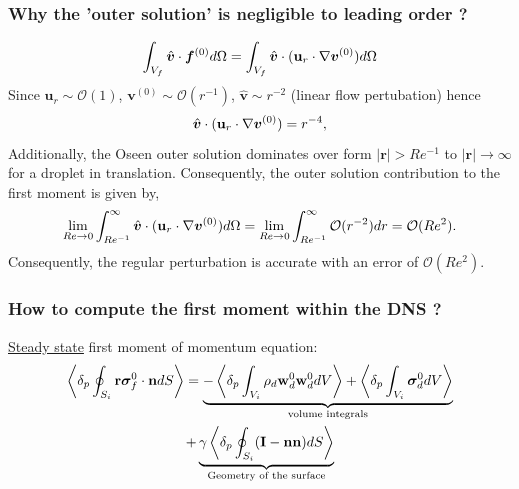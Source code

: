 \documentclass{sintefbeamer}
\begin{document}
\begin{frame}
  \frametitle{Why the 'outer solution' is negligible to leading order ?}
  \begin{equation}
    \int _{V_f}\hat{\bm v} \cdot \bm f^{(0)} d\Omega= \int _{V_f}\hat{\bm v}\cdot(\textbf{u}_r\cdot\grad \bm v^{(0)}) d\Omega
  \end{equation}
  Since $\textbf{u}_r\sim \mathcal{O}(1)$, $\bm v^{(0)}\sim \mathcal{O}(r^{-1})$, $\hat{\bm v} \sim r^{-2}$ (linear flow pertubation) hence 
  \begin{equation}
    \hat{\bm v}\cdot(\textbf{u}_r\cdot\grad \bm v^{(0)}) = r^{-4},
  \end{equation}
  Additionally, the Oseen outer solution dominates over form $|\textbf{r}| > Re^{-1}$ to $|\textbf{r}|\to \infty$ for a droplet in translation.
  Consequently, the outer solution contribution to the first moment is given by, 
  \begin{equation}
      \lim_{Re \to 0 }
      \int_{Re^{-1}}^\infty
      \hat{\bm v}\cdot(\textbf{u}_r\cdot\grad \bm v^{(0)})
      d\Omega
      =
      \lim_{Re \to 0 }
      \int_{Re^{-1}}^\infty
      \mathcal{O}(r^{-2})
      dr
      = \mathcal{O}(Re^2). 
  \end{equation}
  Consequently, the regular perturbation is accurate with an error of $\mathcal{O}(Re^2)$. 
\end{frame}

\begin{frame}
  \frametitle{How to compute the first moment within the DNS ?}

  \underline{Steady state} first moment of momentum equation:
  \begin{multline*}
    \pSavg[i]{\textbf{r}\bm\sigma_f^0\cdot \textbf{n}}
    = 
    \underbrace{- \pOavg[i]{\rho_d \textbf{w}_d^0  \textbf{w}_d^0 }
    + \pOavg[i]{\bm\sigma_d^0}}_\text{volume integrals}\\
    +  \underbrace{\gamma \pSavg[i]{(\textbf{I} - \textbf{nn})}}_\text{Geometry of the surface}
\end{multline*}

\end{frame}
\end{document}
